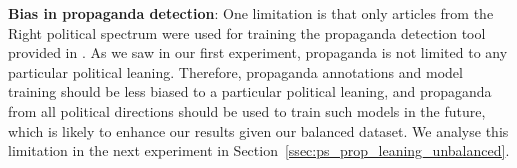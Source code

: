 \noindent\textbf{Bias in propaganda detection}: One limitation is that only articles from the Right political spectrum were used for training the propaganda detection tool provided in \cite{da2019fine}. %
As we saw in our first experiment, propaganda is not limited to any particular political leaning. Therefore, propaganda annotations and model training should be less biased to a particular political leaning, and propaganda from all political directions should be used to train such models in the future, which is likely to enhance our results given our balanced dataset. We analyse this limitation in the next experiment in Section~\ref{ssec:ps_prop_leaning_unbalanced}.

